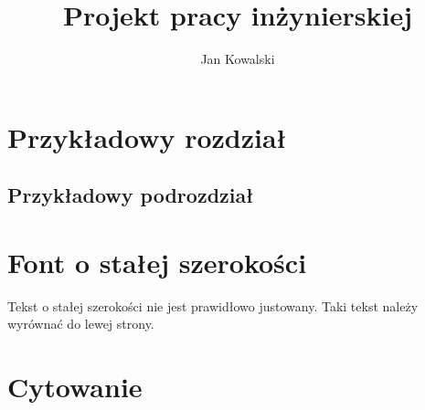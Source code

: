 \documentclass[]{wsbthesis}
\author{Jan Kowalski}
\title{Projekt pracy inżynierskiej}
\begin{document}

\maketitle{}
\printtableofcontent{}

\setcounter{page}{1}

\chapter{Przykładowy rozdział}
\section{Przykładowy podrozdział}

\chapter{Font o stałej szerokości}
Tekst o stałej szerokości nie jest prawidłowo justowany. Taki tekst należy wyrównać do lewej strony.
\begin{flushleft}
    \ttfamily{} %
\end{flushleft}

\chapter{Cytowanie}
\end{document}
